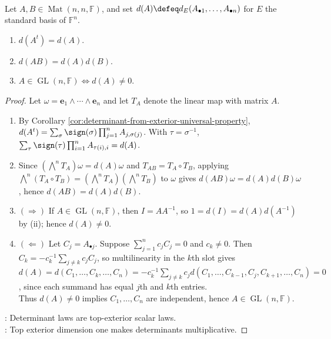\begin{corollary} \label{cor:exterior-determinant-basic-properties} \\
Let $A,B\in\operatorname{Mat}(n,n,\mathbb{F})$, and set $d(A)\defeq d_E(A_{\bullet1},\ldots,A_{\bullet n})$ for $E$ the standard basis of $\mathbb{F}^n$.
\begin{enumerate}[label=(\roman*)]
\setlength{\itemsep}{0pt}
\item $d(A^t)=d(A)$.
\item $d(AB)=d(A)d(B)$.
\item $A\in\operatorname{GL}(n,\mathbb{F})\Longleftrightarrow d(A)\neq0$.
\end{enumerate}
\begin{proof}
Let $\omega=\mathbf{e}_1\wedge\cdots\wedge\mathbf{e}_n$ and let $T_A$ denote the linear map with matrix $A$.
\begin{enumerate}[label=(\roman*)]
\setlength{\itemsep}{0pt}
\item By Corollary \ref{cor:determinant-from-exterior-universal-property}, $d(A^t)=\sum_{\sigma}\sign(\sigma)\prod_{j=1}^{n}A_{j,\sigma(j)}$. With $\tau=\sigma^{-1}$, $\sum_{\tau}\sign(\tau)\prod_{i=1}^{n}A_{\tau(i),i}=d(A)$.
\item Since $(\bigwedge^n T_A)\omega=d(A)\omega$ and $T_{AB}=T_A\circ T_B$, applying $\bigwedge^n(T_A\circ T_B)=(\bigwedge^n T_A)(\bigwedge^n T_B)$ to $\omega$ gives $d(AB)\omega=d(A)d(B)\omega$, hence $d(AB)=d(A)d(B)$.
\item[$(iii)$]$(\Rightarrow)$ If $A\in\operatorname{GL}(n,\mathbb{F})$, then $I=AA^{-1}$, so $1=d(I)=d(A)d(A^{-1})$ by (ii); hence $d(A)\neq0$.
\item[$(iii)$]$(\Leftarrow)$ Let $C_j=A_{\bullet j}$. Suppose $\sum_{j=1}^{n}c_jC_j=0$ and $c_k\neq0$. Then $C_k=-c_k^{-1}\sum_{j\neq k}c_jC_j$, so multilinearity in the $k$th slot gives $d(A)=d(C_1,\ldots,C_k,\ldots,C_n) =-c_k^{-1}\sum\limits_{j\neq k}c_jd(C_1,\ldots,C_{k-1},C_j,C_{k+1},\ldots,C_n)=0$, since each summand has equal $j$th and $k$th entries.\\
Thus $d(A)\neq0$ implies $C_1,\ldots,C_n$ are independent, hence $A\in\operatorname{GL}(n,\mathbb{F})$.
\end{enumerate}
: Determinant laws are top-exterior scalar laws.\\
: Top exterior dimension one makes determinants multiplicative.
\end{proof}
\end{corollary}
